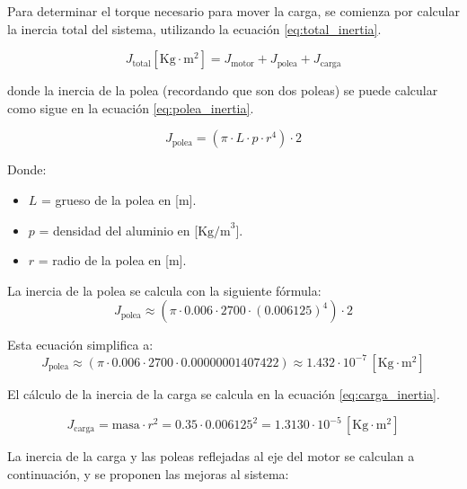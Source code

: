 \documentclass[14pt,oneside]{extarticle} %
\begin{document}
Para determinar el torque necesario para mover la carga, se comienza por calcular la inercia total del sistema, utilizando la ecuación \ref{eq:total_inertia}.

\begin{equation}
J_{\text{total}} [\text{Kg} \cdot \text{m}^2] = J_{\text{motor}} + J_{\text{polea}} + J_{\text{carga}}
\label{eq:total_inertia}
\end{equation}

donde la inercia de la polea (recordando que son dos poleas) se puede calcular como sigue en la ecuación \ref{eq:polea_inertia}.

\begin{equation}
J_{\text{polea}} = (\pi \cdot L \cdot p \cdot r^4) \cdot 2
\label{eq:polea_inertia}
\end{equation}


Donde:
\begin{itemize}
    \item $L$ = grueso de la polea en [m].
    \item $p$ = densidad del aluminio en [$\text{Kg/m}^3$].
    \item $r$ = radio de la polea en [m].
\end{itemize}

La inercia de la polea se calcula con la siguiente fórmula:
\begin{equation}
J_{\text{polea}} \approx \left( \pi \cdot 0.006 \cdot 2700 \cdot (0.006125)^4 \right) \cdot 2
\label{eq:inertia_polea}
\end{equation}

Esta ecuación simplifica a:
\begin{equation}
J_{\text{polea}} \approx \left( \pi \cdot 0.006 \cdot 2700 \cdot 0.00000001407422 \right) \approx 1.432 \cdot 10^{-7} \, [\text{Kg} \cdot \text{m}^2]
\label{eq:inertia_polea_simplified}
\end{equation}


El cálculo de la inercia de la carga se calcula en la ecuación \ref{eq:carga_inertia}.

\begin{equation}
J_{\text{carga}} = \text{masa} \cdot r^2 = 0.35 \cdot 0.006125^2 = 1.3130 \cdot 10^{-5} \, [\text{Kg} \cdot \text{m}^2]
\label{eq:carga_inertia}
\end{equation}

La inercia de la carga y las poleas reflejadas al eje del motor se calculan a continuación, y se proponen las mejoras al sistema:
\end{document}
